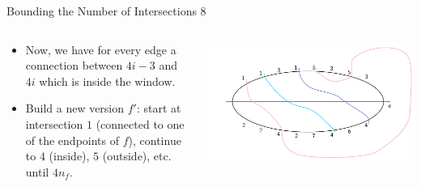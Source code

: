 \documentclass[10pt,aspectratio=169]{beamer}
\theoremstyle{plain}
\begin{document}
\begin{frame}{Bounding the Number of Intersections 8}
    \begin{columns}
    \begin{column}{0.35\textwidth}
        \begin{itemize}
            \item Now, we have for every edge a connection between \(4i-3\) and \(4i\) which is inside the window.
            \item<2-> Build a new version \(f'\): start at intersection \(1\) (connected to one of the endpoints of \(f\)), continue to \(4\) (inside), \(5\) (outside), etc. until \(4 n_f\).            
        \end{itemize}
    \end{column}
    \begin{column}{0.65\textwidth}
        \begin{center}
            \includegraphics[width=\textwidth]{images/figure-9.pdf}
        \end{center}
    \end{column}
    \end{columns}
\end{frame}
\end{document}
